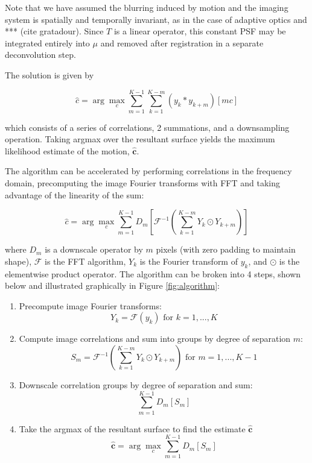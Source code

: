 \documentclass{article}
\begin{document}
Note that we have assumed the blurring induced by motion and the imaging system is spatially and temporally invariant, as in the case of adaptive optics and *** (cite gratadour).  Since $T$ is a linear operator, this constant PSF may be integrated entirely into $\mu$ and removed after registration in a separate deconvolution step.

The solution is given by

$$
\hat{c} = \arg \max_c \sum_{m=1}^{K-1}\sum_{k=1}^{K-m} (y_k \ast y_{k+m})[mc]
$$

which consists of a series of correlations, 2 summations, and a downsampling operation.  Taking argmax over the resultant surface yields the maximum likelihood estimate of the motion, $\hat{\bm{c}}$.

The algorithm can be accelerated by performing correlations in the frequency domain, precomputing the image Fourier transforms with FFT and taking advantage of the linearity of the sum:

\begin{equation}
\hat{c} = \arg \max_c \sum_{m=1}^{K-1} D_m \left[
\mathcal{F}^{-1} \left( \sum_{k=1}^{K-m} Y_k \odot Y_{k+m} \right)
\right]
\label{eq:algorithm}
\end{equation}

where $D_m$ is a downscale operator by $m$ pixels (with zero padding to maintain shape), $\mathcal{F}$ is the FFT algorithm, $Y_k$ is the Fourier transform of $y_k$, and $\odot$ is the elementwise product operator.
The algorithm can be broken into 4 steps, shown below and illustrated graphically in Figure \ref{fig:algorithm}:

\begin{enumerate}
  \item Precompute image Fourier transforms:
    $$Y_k=\mathcal{F}(y_k) \text{ for } k=1,...,K$$
  \item Compute image correlations and sum into groups by degree of separation $m$:
    $$S_m = \mathcal{F}^{-1} \left( \sum_{k=1}^{K-m} Y_k \odot Y_{k+m} \right) \text{ for } m=1, ..., K-1$$
  \item Downscale correlation groups by degree of separation and sum:
    $$\sum_{m=1}^{K-1} D_m \left[ S_m \right]$$
  \item Take the argmax of the resultant surface to find the estimate $\hat{\bm{c}}$
    $$\hat{\bm{c}} = \arg \max_c \sum_{m=1}^{K-1} D_m \left[ S_m \right]$$
\end{enumerate}
\end{document}
